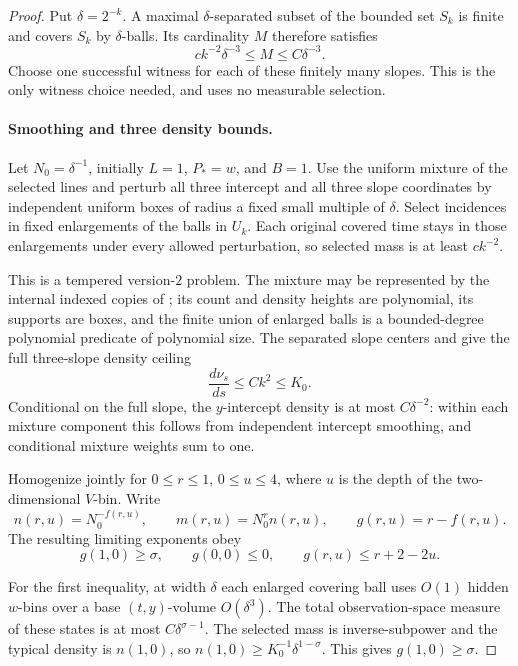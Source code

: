 \begin{proof}
Put \(\delta=2^{-k}\).
A maximal \(\delta\)-separated subset of the bounded
set \(S_k\) is finite and covers \(S_k\) by
\(\delta\)-balls.  Its cardinality \(M\) therefore
satisfies
\begin{equation}
 c k^{-2}\delta^{-3}\le M\le C\delta^{-3}.
 \label{a01:finite-slope-packing}
\end{equation}
Choose one successful witness for each of these
finitely many slopes.  This is the only witness
choice needed, and uses no measurable selection.

\paragraph{Smoothing and three density bounds.}
Let \(N_0=\delta^{-1}\), initially \(L=1\),
\(P_*=w\), and \(B=1\).
Use the uniform mixture of the selected lines and
perturb all three intercept and all three slope
coordinates by independent uniform boxes of radius
a fixed small multiple of \(\delta\).
Select incidences in fixed enlargements of the balls
in \(U_k\).
Each original covered time stays in those enlargements
under every allowed perturbation, so selected mass is
at least \(ck^{-2}\).

This is a tempered version-\(2\) problem.
The mixture may be represented by the internal indexed
copies of ; its count and density
heights are polynomial, its supports are boxes, and
the finite union of enlarged balls is a bounded-degree
polynomial predicate of polynomial size.
The separated slope centers and
 give the full
three-slope density ceiling
\begin{equation}
 \frac{d\nu_s}{ds}\le Ck^2\le K_0.
 \label{a01:original-slope-cap}
\end{equation}
Conditional on the full slope, the \(y\)-intercept
density is at most \(C\delta^{-2}\): within each
mixture component this follows from independent
intercept smoothing, and conditional mixture weights
sum to one.

Homogenize jointly for \(0\le r\le1\), \(0\le u\le4\),
where \(u\) is the depth of the two-dimensional
\(V\)-bin.  Write
\[
 n(r,u)=N_0^{-f(r,u)},\qquad
 m(r,u)=N_0^r n(r,u),\qquad
 g(r,u)=r-f(r,u).
\]
The resulting limiting exponents obey
\begin{equation}
 g(1,0)\ge\sigma,\qquad
 g(0,0)\le0,\qquad
 g(r,u)\le r+2-2u.
 \label{a01:initial-density-inequalities}
\end{equation}

For the first inequality, at width \(\delta\) each
enlarged covering ball uses \(O(1)\) hidden \(w\)-bins
over a base \((t,y)\)-volume \(O(\delta^3)\).
The total observation-space measure of these states
is at most \(C\delta^{\sigma-1}\).
The selected mass is inverse-subpower and the typical
density is \(n(1,0)\), so
\(n(1,0)\ge K_0^{-1}\delta^{1-\sigma}\).
This gives \(g(1,0)\ge\sigma\).


\end{proof}
